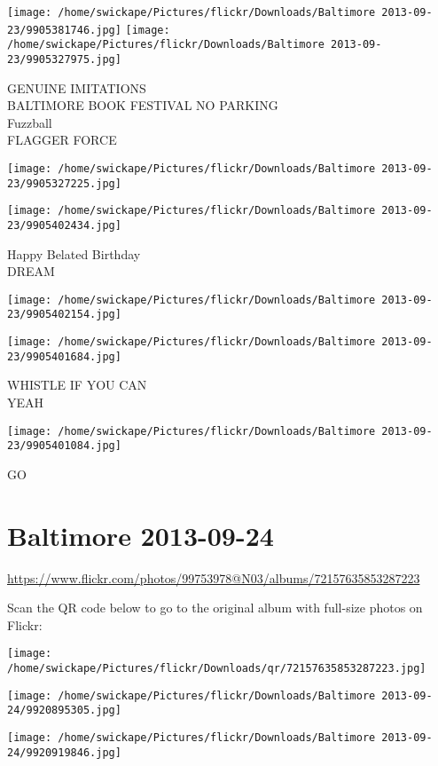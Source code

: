 \documentclass[10pt,letterpaper]{article}
\begin{document}
\texttt{[image: /home/swickape/Pictures/flickr/Downloads/Baltimore 2013-09-23/9905381746.jpg]}
\texttt{[image: /home/swickape/Pictures/flickr/Downloads/Baltimore 2013-09-23/9905327975.jpg]}

GENUINE IMITATIONS\\
BALTIMORE BOOK FESTIVAL NO PARKING\\
Fuzzball\\
FLAGGER FORCE
\pagebreak

\texttt{[image: /home/swickape/Pictures/flickr/Downloads/Baltimore 2013-09-23/9905327225.jpg]}

\vspace{0.25in}
\texttt{[image: /home/swickape/Pictures/flickr/Downloads/Baltimore 2013-09-23/9905402434.jpg]}

Happy Belated Birthday\\
DREAM
\pagebreak

\texttt{[image: /home/swickape/Pictures/flickr/Downloads/Baltimore 2013-09-23/9905402154.jpg]}

\vspace{0.25in}
\texttt{[image: /home/swickape/Pictures/flickr/Downloads/Baltimore 2013-09-23/9905401684.jpg]}

WHISTLE IF YOU CAN\\
YEAH
\pagebreak

\texttt{[image: /home/swickape/Pictures/flickr/Downloads/Baltimore 2013-09-23/9905401084.jpg]}

GO
\pagebreak

\section*{Baltimore 2013-09-24}

\url{https://www.flickr.com/photos/99753978@N03/albums/72157635853287223}

Scan the QR code below to go to the original album with full-size photos on Flickr:

\texttt{[image: /home/swickape/Pictures/flickr/Downloads/qr/72157635853287223.jpg]}
\pagebreak

\texttt{[image: /home/swickape/Pictures/flickr/Downloads/Baltimore 2013-09-24/9920895305.jpg]}

\vspace{0.25in}
\texttt{[image: /home/swickape/Pictures/flickr/Downloads/Baltimore 2013-09-24/9920919846.jpg]}
\end{document}
